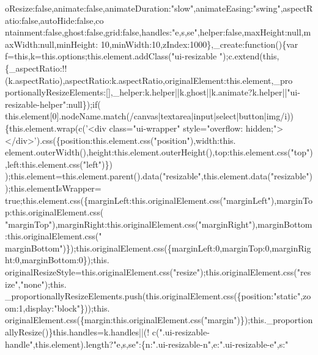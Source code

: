 \begin{DoxyCode}
      oResize:false,animate:false,animateDuration:\textcolor{stringliteral}{"slow"},animateEasing:\textcolor{stringliteral}{"swing"},aspectRatio:false,autoHide:false,co
      ntainment:false,ghost:false,grid:false,handles:\textcolor{stringliteral}{"e,s,se"},helper:false,maxHeight:null,maxWidth:null,minHeight:
      10,minWidth:10,zIndex:1000\},\_create:\textcolor{keyword}{function}()\{var f=this,k=this.options;this.element.addClass(\textcolor{stringliteral}{"ui-resizable
      "});c.extend(this,\{\_aspectRatio:!!(k.aspectRatio),aspectRatio:k.aspectRatio,originalElement:this.element,\_pro
      portionallyResizeElements:[],\_helper:k.helper||k.ghost||k.animate?k.helper||\textcolor{stringliteral}{"ui-resizable-helper"}:null\});\textcolor{keywordflow}{if}(
      this.element[0].nodeName.match(/canvas|textarea|input|select|button|img/i))\{this.element.wrap(c(\textcolor{stringliteral}{'<div
       class="ui-wrapper" style="overflow: hidden;"></div>'}).css(\{position:this.element.css(\textcolor{stringliteral}{"position"}),width:this.
      element.outerWidth(),height:this.element.outerHeight(),top:this.element.css(\textcolor{stringliteral}{"top"}),left:this.element.css(\textcolor{stringliteral}{"left"})\})
      );this.element=this.element.parent().data(\textcolor{stringliteral}{"resizable"},this.element.data(\textcolor{stringliteral}{"resizable"}));this.elementIsWrapper=\textcolor{keyword}{
      true};this.element.css(\{marginLeft:this.originalElement.css(\textcolor{stringliteral}{"marginLeft"}),marginTop:this.originalElement.css(\textcolor{stringliteral}{
      "marginTop"}),marginRight:this.originalElement.css(\textcolor{stringliteral}{"marginRight"}),marginBottom:this.originalElement.css(\textcolor{stringliteral}{"
      marginBottom"})\});this.originalElement.css(\{marginLeft:0,marginTop:0,marginRight:0,marginBottom:0\});this.
      originalResizeStyle=this.originalElement.css(\textcolor{stringliteral}{"resize"});this.originalElement.css(\textcolor{stringliteral}{"resize"},\textcolor{stringliteral}{"none"});this.
      \_proportionallyResizeElements.push(this.originalElement.css(\{position:\textcolor{stringliteral}{"static"},zoom:1,display:\textcolor{stringliteral}{"block"}\}));this.
      originalElement.css(\{margin:this.originalElement.css(\textcolor{stringliteral}{"margin"})\});this.\_proportionallyResize()\}this.handles=k.handles||(!
      c(\textcolor{stringliteral}{".ui-resizable-handle"},this.element).length?\textcolor{stringliteral}{"e,s,se"}:\{n:\textcolor{stringliteral}{".ui-resizable-n"},e:\textcolor{stringliteral}{".ui-resizable-e"},s:\textcolor{stringliteral}{"
}
\end{DoxyCode}
